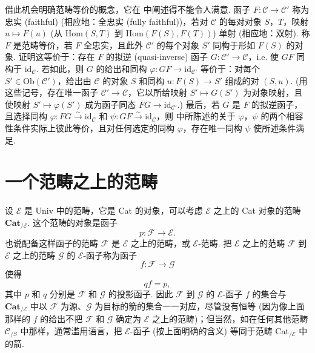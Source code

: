 借此机会明确范畴等价的概念，它在 \cite{exp06-1} 中阐述得不能令人满意. 函子 $F \colon \mathcal{C} \to \mathcal{C}'$ 称为忠实 (faithful) (相应地：全忠实 (fully faithful))，若对 $\mathcal{C}$ 的每对对象 $S$，$T$，映射 $u \mapsto F(u)$ (从 $\mathrm{Hom}(S, T)$ 到 $\mathrm{Hom}(F(S), F(T))$) 单射 (相应地：双射). 称 $F$ 是范畴等价，若 $F$ 全忠实，且此外 $\mathcal{C}'$ 的每个对象 $S'$ 同构于形如 $F(S)$ 的对象. 证明这等价于：存在 $F$ 的拟逆 (quasi-inverse) 函子 $G \colon \mathcal{C}' \to \mathcal{C}$，i.e. 使 $GF$ 同构于 $\mathrm{id}_{\mathcal{C}}$. 若如此，则 $G$ 的给出和同构 $\varphi \colon GF \to \mathrm{id}_{\mathcal{C}'}$ 等价于：对每个 $S' \in \mathrm{Ob}(\mathcal{C}')$，给出由 $\mathcal{C}$ 的对象 $S$ 和同构 $u \colon F(S) \to S'$ 组成的对 $(S, u)$. (用这些记号，存在唯一函子 $\mathcal{C}' \to \mathcal{C}$，它以所给映射 $S' \mapsto G(S')$ 为对象映射，且使映射 $S' \mapsto \varphi(S')$ 成为函子同态 $FG \to \mathrm{id}_{\mathcal{C}'}$.) 最后，若 $G$ 是 $F$ 的拟逆函子，且选择同构 $\varphi \colon FG \xrightarrow{\sim} \mathrm{id}_{\mathcal{C}}$ 和 $\psi \colon GF \stackrel{\sim}{\longrightarrow} \mathrm{id}_{\mathcal{C}}$，则 \cite[I.1.2]{exp06-1} 中所陈述的关于 $\varphi$，$\psi$ 的两个相容性条件实际上彼此等价，且对任何选定的同构 $\varphi$，存在唯一同构 $\psi$ 使所述条件满足.

\section{一个范畴之上的范畴}

设 $\mathcal{E}$ 是 Univ 中的范畴，它是 Cat 的对象，可以考虑 $\mathcal{E}$ 之上的 Cat 对象的范畴 $\mathbf{Cat}_{/\mathcal{E}}$. 这个范畴的对象是函子
\[
p \colon \mathcal{F} \longrightarrow \mathcal{E}.
\]
也说配备这样函子的范畴 $\mathcal{F}$ 是 $\mathcal{E}$ 之上的范畴，或 $\mathcal{E}$-范畴. 把 $\mathcal{E}$ 之上的范畴 $\mathcal{F}$ 到 $\mathcal{E}$ 之上的范畴 $\mathcal{G}$ 的 $\mathcal{E}$-函子称为函子
\[
f \colon \mathcal{F} \longrightarrow \mathcal{G}
\]
使得
\[
q f = p,
\]
其中 $p$ 和 $q$ 分别是 $\mathcal{F}$ 和 $\mathcal{G}$ 的投影函子. 因此 $\mathcal{F}$ 到 $\mathcal{G}$ 的 $\mathcal{E}$-函子 $f$ 的集合与 $\mathbf{Cat}_{/\mathcal{E}}$ 中以 $\mathcal{F}$ 为源、$\mathcal{G}$ 为目标的箭的集合一一对应，尽管没有恒等 (因为像上面那样的 $f$ 的给出不把 $\mathcal{F}$ 和 $\mathcal{G}$ 确定为 $\mathcal{E}$ 之上的范畴)；但当然，如在任何其他范畴 $\mathcal{C}_{/S}$ 中那样，通常滥用语言，把 $\mathcal{E}$-函子 (按上面明确的含义) 等同于范畴 Cat$_{/\mathcal{E}}$ 中的箭.

